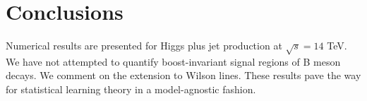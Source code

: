 \section{Conclusions}\label{sec:conclusions}

Numerical results are presented for Higgs plus jet production at
$\sqrt{s} = 14$ TeV. We have not attempted to quantify boost-invariant
signal regions of B meson decays. We comment on the extension to Wilson
lines. These results pave the way for statistical learning theory in a
model-agnostic fashion.

